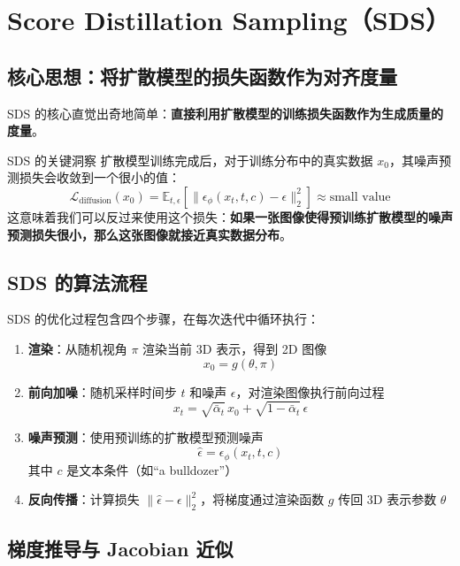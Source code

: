\section{Score Distillation Sampling（SDS）}

\subsection{核心思想：将扩散模型的损失函数作为对齐度量}

SDS 的核心直觉出奇地简单：\textbf{直接利用扩散模型的训练损失函数作为生成质量的度量}。

\begin{importantbox}{SDS 的关键洞察}
扩散模型训练完成后，对于训练分布中的真实数据 $x_0$，其噪声预测损失会收敛到一个很小的值：
$$
\mathcal{L}_{\text{diffusion}}(x_0) = \mathbb{E}_{t, \epsilon}\left[\| \epsilon_\phi(x_t, t, c) - \epsilon \|_2^2\right] \approx \text{small value}
$$
这意味着我们可以反过来使用这个损失：\textbf{如果一张图像使得预训练扩散模型的噪声预测损失很小，那么这张图像就接近真实数据分布}。
\end{importantbox}

\subsection{SDS 的算法流程}

SDS 的优化过程包含四个步骤，在每次迭代中循环执行：

\begin{enumerate}
    \item \textbf{渲染}：从随机视角 $\pi$ 渲染当前 3D 表示，得到 2D 图像
    $$x_0 = g(\theta, \pi)$$

    \item \textbf{前向加噪}：随机采样时间步 $t$ 和噪声 $\epsilon$，对渲染图像执行前向过程
    $$x_t = \sqrt{\bar{\alpha}_t}\, x_0 + \sqrt{1 - \bar{\alpha}_t}\, \epsilon$$

    \item \textbf{噪声预测}：使用预训练的扩散模型预测噪声
    $$\hat{\epsilon} = \epsilon_\phi(x_t, t, c)$$
    其中 $c$ 是文本条件（如``a bulldozer''）

    \item \textbf{反向传播}：计算损失 $\| \hat{\epsilon} - \epsilon \|_2^2$，将梯度通过渲染函数 $g$ 传回 3D 表示参数 $\theta$
\end{enumerate}

\subsection{梯度推导与 Jacobian 近似}

